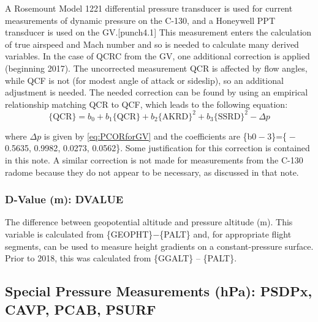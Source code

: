 \documentclass[
  english,
]{book}
\begin{document}
A Rosemount Model 1221 differential pressure transducer is used for current measurements of dynamic pressure on the C-130, and a Honeywell PPT transducer is used on the GV.\protect\hypertarget{punch4.1}{}{{[}punch4.1{]}} This measurement enters the calculation of true airspeed and Mach number and so is needed to calculate many derived variables.
In the case of QCRC from the GV, one additional correction is applied (beginning 2017). The uncorrected measurement QCR is affected by flow angles, while QCF is not (for modest angle of attack or sideslip), so an additional adjustment is needed. The needed correction can be found by using an empirical relationship matching QCR to QCF, which leads to the following equation:\\
\begin{equation}
\mathrm{\{QCR\}}=b_0+b_1\mathrm{\{QCR\}}+b_2\mathrm{\{AKRD\}}^2+b_3\mathrm{\{SSRD\}}^2-\Delta p
\label{eq:PCORforQCR}
\end{equation}

where \(\Delta p\) is given by \eqref{eq:PCORforGV} and the coefficients are \{{b0 − 3}\}=\{{ − 0.5635}, {0.9982}, 0.0273, {0.0562}\}. Some justification for this correction is contained in this note. A similar correction is not made for measurements from the C-130 radome because they do not appear to be necessary, as discussed in that note.

\hypertarget{dvalue}{%
\subsubsection*{D-Value (m): DVALUE}\label{dvalue}}

The difference between geopotential altitude and pressure altitude (m). This variable is calculated from \{GEOPHT\}{−}\{PALT\} and, for appropriate flight segments, can be used to measure height gradients on a constant-pressure surface. Prior to 2018, this was calculated from \{GGALT\} -- \{PALT\}.

\hypertarget{p-special}{%
\subsection*{Special Pressure Measurements (hPa): PSDPx, CAVP, PCAB, PSURF}\label{p-special}}
\end{document}
